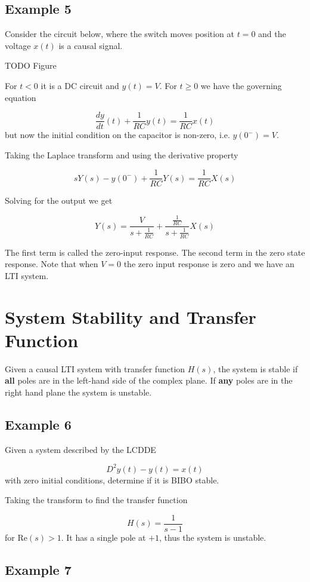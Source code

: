 \documentclass{article}
\begin{document}
\subsection{Example 5}

Consider the circuit below, where the switch moves position at $t=0$ and the voltage $x(t)$ is a causal signal.

TODO Figure

For $t < 0$ it is a DC circuit and $y(t) = V$. For $t \geq 0$ we have the governing equation

$$
\frac{dy}{dt}(t) + \frac{1}{RC} y(t) = \frac{1}{RC} x(t)
$$
but now the initial condition on the capacitor is non-zero, i.e. $y(0^-) = V$.

Taking the Laplace transform and using the derivative property

$$
sY(s) - y(0^-) + \frac{1}{RC} Y(s) = \frac{1}{RC} X(s)
$$

Solving for the output we get

$$
Y(s) = \frac{V}{s + \frac{1}{RC}} + \frac{\frac{1}{RC}}{s + \frac{1}{RC}} X(s)
$$

The first term is called the zero-input response. The second term in the zero state response. Note that when $V = 0$ the zero input response is zero and we have an LTI system.

\section{System Stability and Transfer Function}

Given a causal LTI system with transfer function $H(s)$, the system is stable if \textbf{all} poles are in the left-hand side of the complex plane. If \textbf{any} poles are in the right hand plane the system is unstable. 

\subsection{Example 6}

Given a system described by the LCDDE

$$
D^2 y(t) - y(t) = x(t)
$$
with zero initial conditions, determine if it is BIBO stable.

Taking the transform to find the transfer function

$$
H(s) = \frac{1}{s-1}
$$
for $\text{Re}(s) > 1$. It has a single pole at $+1$, thus the system is unstable.

\subsection{Example 7}
\end{document}
